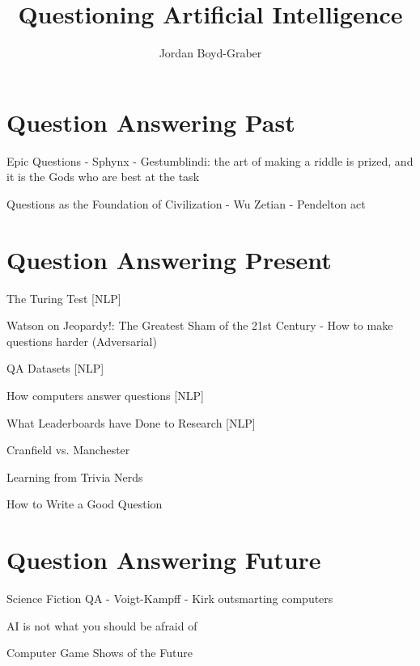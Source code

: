 \documentclass[bfivepaper,twosided,justified,nobib]{tufte-book}
\title{Questioning Artificial Intelligence}
\author{Jordan Boyd-Graber}
\begin{document}


% 



\clearpage

\part{Question Answering Past}

Epic Questions
- Sphynx
- Gestumblindi: the art of making a riddle is prized, and it is the
Gods who are best at the task

Questions as the Foundation of Civilization
- Wu Zetian
- Pendelton act


\part{Question Answering Present}

The Turing Test [NLP]

Watson on Jeopardy!: The Greatest Sham of the 21st Century 
 - How to make questions harder (Adversarial)

QA Datasets [NLP]

How computers answer questions [NLP]

What Leaderboards have Done to Research [NLP]

Cranfield vs. Manchester

Learning from Trivia Nerds

How to Write a Good Question

\part{Question Answering Future}

Science Fiction QA
- Voigt-Kampff
- Kirk outsmarting computers

AI is not what you should be afraid of

Computer Game Shows of the Future






\backmatter





\printindex
\end{document}
